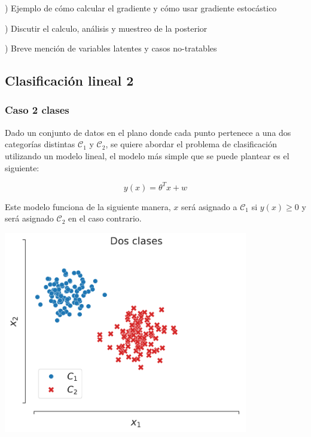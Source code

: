 \begin{mdframed}[style=pendiente, frametitle={\center Cosas pendiente}]

) Ejemplo de cómo calcular el gradiente y cómo usar gradiente estocástico

) Discutir el calculo, análisis y muestreo de la posterior 

) Breve mención de variables latentes y casos no-tratables 


\end{mdframed}




\subsection{Clasificación lineal 2}


\subsubsection{Caso 2 clases}

\begin{minipage}{0.4\textwidth}
    Dado un conjunto de datos en el plano donde cada punto pertenece a una dos categorías distintas $\mathcal{C}_1$ y $\mathcal{C}_2$, se quiere abordar el problema de clasificación utilizando un modelo lineal, el modelo más simple que se puede plantear es el siguiente:
    
    \begin{equation}
        y(x) = \theta^Tx + w
    \end{equation}
    
    Este modelo funciona de la siguiente manera, $x$ será asignado a $\mathcal{C}_1$ si $y(x) \geq 0$ y será asignado $\mathcal{C}_2$ en el caso contrario.
\end{minipage}\hfill
\begin{minipage}{0.5\textwidth}
    \centering
    \includegraphics[width=0.8\textwidth]{img/cap2_dosclases}\\
    \label{fig:puntos_2d}
\end{minipage}


